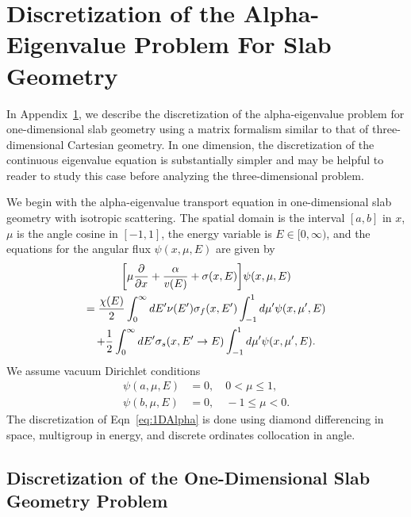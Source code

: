 \chapter[Discretization of the Alpha-Eigenvalue Problem For Slab Geometry][Discretized Slab Alpha-Eigenvalue Problem]{Discretization of the Alpha-Eigenvalue Problem For Slab Geometry}

\label{Discrete1D}

In Appendix~\ref{Discrete1D}, we describe the discretization of the alpha-eigenvalue problem for one-dimensional slab geometry using a matrix formalism similar to that of three-dimensional Cartesian geometry. In one dimension, the discretization of the continuous eigenvalue equation is substantially simpler and may be helpful to reader to study this case before analyzing the three-dimensional problem.

We begin with the alpha-eigenvalue transport equation in one-dimensional slab geometry with isotropic scattering. The spatial domain is the interval $[a,b]$ in $x$, $\mu$ is the angle cosine in $[-1,1]$, the energy variable is $E \in [0, \infty)$, and the equations for the angular flux $\psi(x, \mu, E)$ are given by
\begin{multline}
\bigg [ \mu \frac{\partial}{\partial x} + \frac{\alpha}{v(E)} + \sigma(x,E) \bigg ] \psi(x,\mu,E) \\ = \frac{\chi(E)}{2} \int_{0}^{\infty} \mathop{}\!d E' \nu(E') \sigma_{f}(x,E') \int_{-1}^{1} \mathop{}\!d \mu' \psi(x,\mu',E) \\ + \frac{1}{2} \int_{0}^{\infty} \mathop{}\!d E' \sigma_{s}(x, E' \rightarrow E) \int_{-1}^{1} \mathop{}\!d \mu' \psi(x,\mu',E).
\label{eq:1DAlpha}
\end{multline}
We assume vacuum Dirichlet conditions
\begin{align}
	\psi(a, \mu, E) &=0, \quad 0 < \mu \leq 1, \\
        \psi(b, \mu, E) &=0, \quad -1 \leq \mu < 0.
\end{align}
The discretization of Eqn~\ref{eq:1DAlpha} is done using diamond differencing in space, multigroup in energy, and discrete ordinates collocation in angle.

\section{Discretization of the One-Dimensional Slab Geometry Problem}

